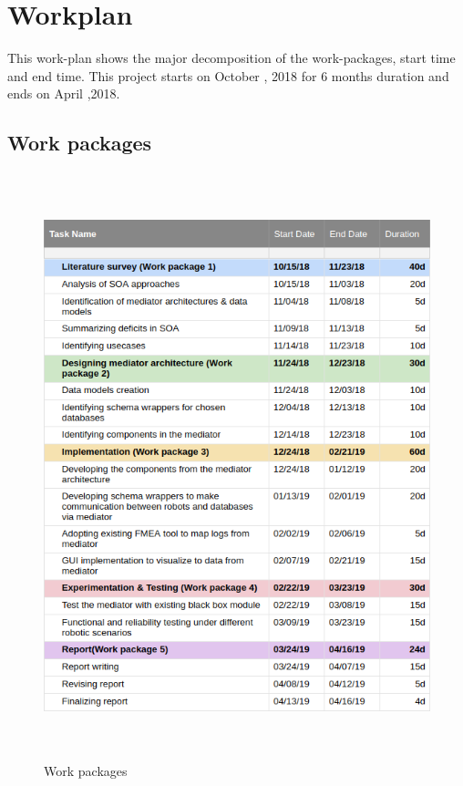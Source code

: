 \documentclass[12pt]{article}
\begin{document}
\section{Workplan}
This work-plan shows the major decomposition of the work-packages, start time and end time. This project starts on October , 2018 for 6 months duration and ends on April ,2018.
\newpage
\subsection{Work packages}
\begin{figure}[h!]
  \includegraphics[width=\linewidth,height=17cm]{wp_v1.png}
  \caption{Work packages}
  \label{fig:work_packages}
\end{figure}
\end{document}
